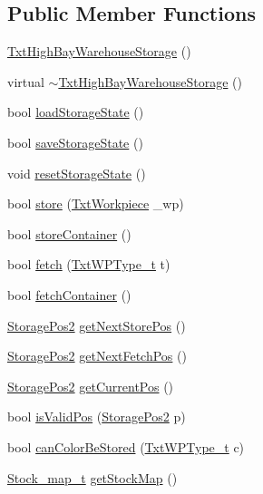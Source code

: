 \subsection*{Public Member Functions}
\begin{DoxyCompactItemize}
\item 
\hyperlink{classft_1_1_txt_high_bay_warehouse_storage_a4551a76f2dea3b02c788538cf5e666ec}{Txt\+High\+Bay\+Warehouse\+Storage} ()
\item 
virtual \hyperlink{classft_1_1_txt_high_bay_warehouse_storage_a69187469721bade83966bad55f05866b}{$\sim$\+Txt\+High\+Bay\+Warehouse\+Storage} ()
\item 
bool \hyperlink{classft_1_1_txt_high_bay_warehouse_storage_a1a060437a59198b8255e14d358e2ba2b}{load\+Storage\+State} ()
\item 
bool \hyperlink{classft_1_1_txt_high_bay_warehouse_storage_adf467b1079ac9da68c9060ba93549a91}{save\+Storage\+State} ()
\item 
void \hyperlink{classft_1_1_txt_high_bay_warehouse_storage_a18e8907efde4005f34a66cb61c2c6421}{reset\+Storage\+State} ()
\item 
bool \hyperlink{classft_1_1_txt_high_bay_warehouse_storage_aa55aba97bcdd43fb1e24b1d86b396f21}{store} (\hyperlink{classft_1_1_txt_workpiece}{Txt\+Workpiece} \+\_\+wp)
\item 
bool \hyperlink{classft_1_1_txt_high_bay_warehouse_storage_ac2bd0a0d9fe261f4d94788ae040b1f69}{store\+Container} ()
\item 
bool \hyperlink{classft_1_1_txt_high_bay_warehouse_storage_a242e726561dc62e093447dfd3b40067f}{fetch} (\hyperlink{namespaceft_a2d5bf01b2da29de3c061682f3195b5b2}{Txt\+W\+P\+Type\+\_\+t} t)
\item 
bool \hyperlink{classft_1_1_txt_high_bay_warehouse_storage_ab02d3081f7f2fafa7bc5a82ced5bfcaf}{fetch\+Container} ()
\item 
\hyperlink{structft_1_1_storage_pos2}{Storage\+Pos2} \hyperlink{classft_1_1_txt_high_bay_warehouse_storage_a10ac1a11e62b9bccabebb2bd5fb81d9e}{get\+Next\+Store\+Pos} ()
\item 
\hyperlink{structft_1_1_storage_pos2}{Storage\+Pos2} \hyperlink{classft_1_1_txt_high_bay_warehouse_storage_a46ba59d51380e1444c65a282d5cb9c73}{get\+Next\+Fetch\+Pos} ()
\item 
\hyperlink{structft_1_1_storage_pos2}{Storage\+Pos2} \hyperlink{classft_1_1_txt_high_bay_warehouse_storage_a33285b237647cd0922644e18b8f8f924}{get\+Current\+Pos} ()
\item 
bool \hyperlink{classft_1_1_txt_high_bay_warehouse_storage_a54b88449e3c92d468addcd83adaf8fb6}{is\+Valid\+Pos} (\hyperlink{structft_1_1_storage_pos2}{Storage\+Pos2} p)
\item 
bool \hyperlink{classft_1_1_txt_high_bay_warehouse_storage_addb4104568362975ae7a86aae00e40b1}{can\+Color\+Be\+Stored} (\hyperlink{namespaceft_a2d5bf01b2da29de3c061682f3195b5b2}{Txt\+W\+P\+Type\+\_\+t} c)
\item 
\hyperlink{namespaceft_a3d5e802a7d78dac37b288630c9b21e64}{Stock\+\_\+map\+\_\+t} \hyperlink{classft_1_1_txt_high_bay_warehouse_storage_ae9285b77591912e78024af7880bb15bc}{get\+Stock\+Map} ()
\end{DoxyCompactItemize}
